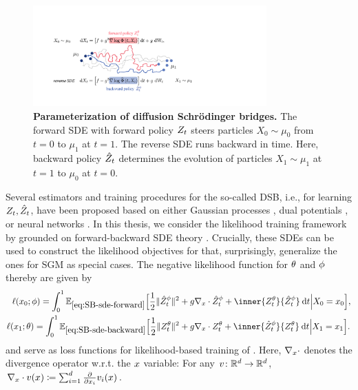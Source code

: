 \begin{figure}[t]
	\centering
	\includegraphics[width=0.8\textwidth]{figures/fig_principle_dsb.pdf}
	\caption{\textbf{Parameterization of diffusion Schr{\"o}dinger bridges.} The forward SDE with forward policy {\color{pink} $Z_t$} steers particles $X_0 \sim \mu_0$ from $t=0$ to $\mu_1$ at $t=1$. The reverse SDE runs backward in time. Here, backward policy {\color{blue} $\hat{Z}_t$} determines the evolution of particles $X_1 \sim \mu_1$ at $t=1$ to $\mu_0$ at $t=0$.} 
	\label{fig:principle_dsb}
\end{figure}

Several estimators and training procedures for the so-called \acrfull{DSB}, i.e., for learning $Z_t, \hat{Z}_t$, have been proposed based on either Gaussian processes \citep{vargas2021solving}, dual potentials \citep{finlay2020learning}, or neural networks \citep{de2021diffusion, chen2021likelihood}.
In this thesis, we consider the likelihood training framework by \citet{chen2021likelihood} grounded on forward-backward \acrshort{SDE} theory \citep{ma1999forward, exarchos2018stochastic}. Crucially, these SDEs can be used to construct the likelihood objectives for  that, surprisingly, generalize the ones for \acrshort{SGM} as special cases. The negative likelihood function for $\theta$ and $\phi$ thereby  are given by
\begin{subequations}
\begin{align}
\lossb =  \int_0^\horizon \mathbb{E}_{\eqref{eq:SB-sde-forward}}\Big[ \frac{1}{2}\norm{\SBbbase^{\paramb}_\ctime}^2 &+\volatbase \Div \SBbbase^{\paramb}_\ctime+ \inner{\SBfbase^{\paramf}_\ctime}{\SBbbase^{\paramb}_\ctime} \dt \Big\vert \sde[0] = \point_0 \Big] ,  \\
\lossf =  \int_0^\horizon \mathbb{E}_{\eqref{eq:SB-sde-backward}}\Big[ \frac{1}{2}\norm{\SBfbase^{\paramf}_\ctime}^2 &+\volatbase \Div \SBfbase^{\paramf}_\ctime + \inner{\SBbbase^{\paramb}_\ctime}{\SBfbase^{\paramf}_\ctime} \dt \Big\vert \sde[\horizon] = \point_{\horizon} \Big].
\end{align}
\end{subequations}
and serve as loss functions for likelihood-based training of . Here, $\nabla_{ {x} } \cdot$ denotes the divergence operator w.r.t. the $x$ variable: For any $v\colon \mathbb{R}^d \to \mathbb{R}^d$, $\nabla_{ {x} } \cdot v(x) \coloneqq \sum_{i=1}^{d} \frac{\partial}{\partial x_{i} } v_i(x)$.

